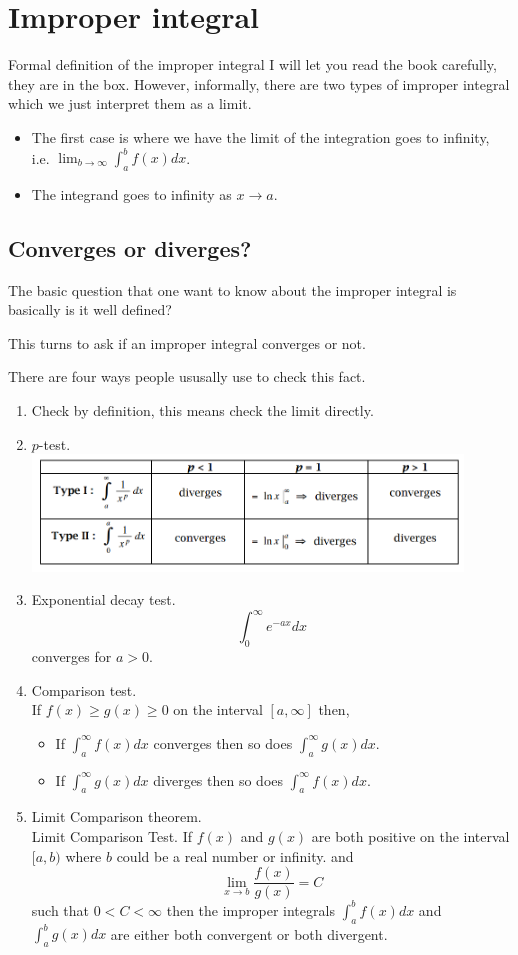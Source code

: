 \documentclass[12pt]{article}
\theoremstyle{definition}
\theoremstyle{definition}
\theoremstyle{remark}
\theoremstyle{definition}
\theoremstyle{definition}
\theoremstyle{definition}
\begin{document}
\section{Improper integral}
Formal definition of the improper integral I will let you read the book carefully, they are in the box. 
However, informally, there are two types of improper integral which we just interpret them as a limit.

\begin{itemize}
	\item The first case is where we have the limit of the integration goes to infinity, i.e. $\lim_{b \to \infty} \int^b_a f(x) dx$.
	\item The integrand goes to infinity as $x \to a$.
\end{itemize}

\subsection{Converges or diverges?}
The basic question that one want to know about the improper integral is basically is it well defined?

This turns to ask if an improper integral converges or not.

There are four ways people ususally use to check this fact.
\begin{enumerate}
	\item Check by definition, this means check the limit directly.
	\item $p$-test.\\
	\includegraphics*[width=0.9\textwidth]{1.png}
	\item Exponential decay test. 
	\[\int^\infty_0 e^{-ax} dx\] converges for $a>0$.
	\item Comparison test.\\
	If $f(x)\geq g(x) \geq 0$ on the interval $[a,\infty]$ then,\begin{itemize}
	\item If $\int^\infty_a f(x) dx$ converges then so does $\int^\infty_a g(x) dx$.
	\item If $\int^\infty_a g(x) dx$ diverges then so does $\int^\infty_a f(x) dx$.
	\end{itemize}
	\item Limit Comparison theorem.\\
	Limit Comparison Test. If $f(x)$ and $g(x)$ are both positive  on the interval $[a,b)$ where $b$ could be a real number or infinity.
	and
	\[\lim_{x\to b}\frac{f(x)}{g(x)} = C\] such that $0 < C < \infty$
	then the improper integrals $\int^b_a f(x) dx$ and $\int^b_a g(x) dx$ are either both convergent or both divergent.

\end{enumerate}
\end{document}
